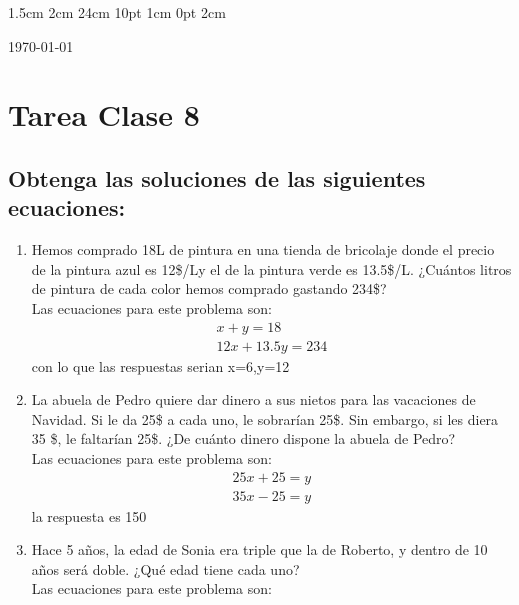 \documentclass[12pt,letterpaper]{report}
\begin{document}
\setmargins{2.5cm}      
{1.5cm}                     
{2cm}  
{24cm}                    
{10pt}                          
{1cm}                          
{0pt}                             
{2cm}
\begin{flushright}
\today
\end{flushright}
\vspace{-1.75cm}
\section*{Tarea Clase 8}
\subsection*{Obtenga las soluciones de las siguientes ecuaciones:}
\begin{enumerate}
    \item Hemos comprado 18L de pintura en una tienda de bricolaje donde el precio de la pintura azul es 
    12\$/Ly el de la pintura verde es 13.5\$/L. ¿Cuántos litros de pintura de cada color hemos comprado gastando 
    234\$?\\
    Las ecuaciones para este problema son:
    \begin{equation*}
        \begin{matrix}
        x+y=18\\12x+13.5y=234
        \end{matrix}
    \end{equation*}
    con lo que las respuestas serian x=6,y=12
    \item La abuela de Pedro quiere dar dinero a sus nietos para las vacaciones de Navidad. Si le da 
    25\$ a cada uno, le sobrarían 25\$. Sin embargo, si les diera 35
    \$, le faltarían 25\$. ¿De cuánto dinero dispone la abuela de Pedro?\\
    Las ecuaciones para este problema son:
    \begin{equation*}
        \begin{matrix}
        25x+25=y\\ 35x-25=y
        \end{matrix}
    \end{equation*}
    la respuesta es 150
    \item Hace 5 años, la edad de Sonia era triple que la de Roberto, y dentro de 10 años será
    doble. ¿Qué edad tiene cada uno?\\
    Las ecuaciones para este problema son:
    \begin{equation*}
        \begin{matrix}

\end{matrix}
\end{equation*}
\end{enumerate}
\end{document}
